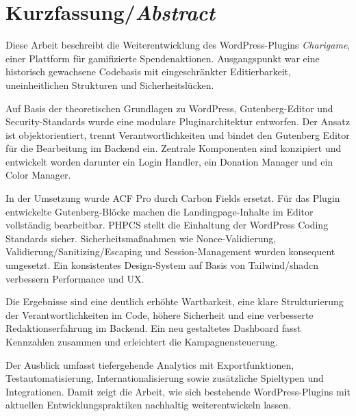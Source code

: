 
\chapter*{Kurzfassung/\emph{Abstract}}
\label{chap:abstract}
Diese Arbeit beschreibt die Weiterentwicklung des WordPress-Plugins \textit{Charigame}, einer Plattform für gamifizierte Spendenaktionen.
Ausgangspunkt war eine historisch gewachsene Codebasis mit eingeschränkter Editierbarkeit, uneinheitlichen Strukturen und Sicherheitslücken.

Auf Basis der theoretischen Grundlagen zu WordPress, Gutenberg-Editor und Security-Standards wurde eine modulare Pluginarchitektur entworfen.
Der Ansatz ist objektorientiert, trennt Verantwortlichkeiten und bindet den Gutenberg Editor für die Bearbeitung im Backend ein.
Zentrale Komponenten sind konzipiert und entwickelt worden darunter ein Login Handler, ein Donation Manager und ein Color Manager.

In der Umsetzung wurde ACF Pro durch Carbon Fields ersetzt. Für das Plugin entwickelte Gutenberg-Blöcke machen die Landingpage-Inhalte im Editor vollständig bearbeitbar.
PHPCS stellt die Einhaltung der WordPress Coding Standards sicher. Sicherheitsmaßnahmen wie Nonce-Validierung, Validierung/Sanitizing/Escaping und Session-Management wurden konsequent umgesetzt.
Ein konsistentes Design-System auf Basis von Tailwind/shadcn verbessern Performance und UX.

Die Ergebnisse sind eine deutlich erhöhte Wartbarkeit, eine klare Strukturierung der Verantwortlichkeiten im Code, höhere Sicherheit und eine verbesserte Redaktionserfahrung im Backend.
Ein neu gestaltetes Dashboard fasst Kennzahlen zusammen und erleichtert die Kampagnensteuerung.

Der Ausblick umfasst tiefergehende Analytics mit Exportfunktionen, Testautomatisierung, Internationalisierung sowie zusätzliche Spieltypen und Integrationen.
Damit zeigt die Arbeit, wie sich bestehende WordPress-Plugins mit aktuellen Entwicklungspraktiken nachhaltig weiterentwickeln lassen.




